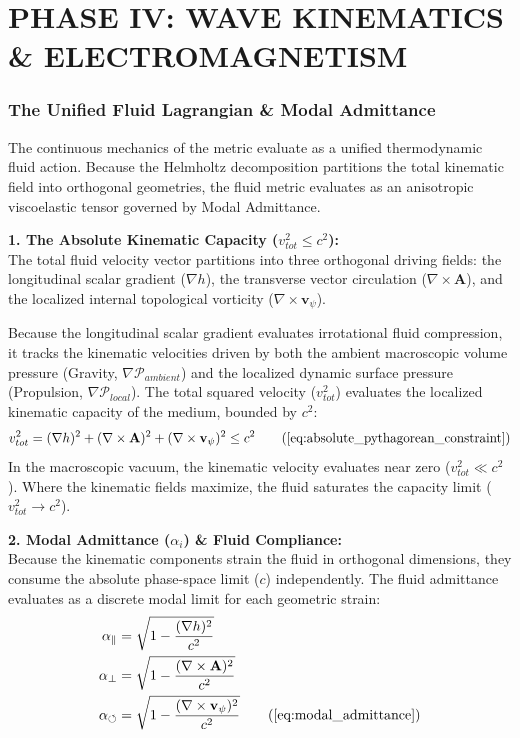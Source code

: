 \documentclass[11pt, a4paper]{article}
\begin{document}
\part*{PHASE IV: WAVE KINEMATICS \& ELECTROMAGNETISM}








\section{The Unified Fluid Lagrangian \& Modal Admittance}
\label{sec:deriv_unified_lagrangian}

The continuous mechanics of the metric evaluate as a unified thermodynamic fluid action. Because the Helmholtz decomposition partitions the total kinematic field into orthogonal geometries, the fluid metric evaluates as an anisotropic viscoelastic tensor governed by Modal Admittance.

\textbf{1. The Absolute Kinematic Capacity ($v_{tot}^2 \le c^2$):} \\
The total fluid velocity vector partitions into three orthogonal driving fields: the longitudinal scalar gradient ($\nabla h$), the transverse vector circulation ($\nabla \times \mathbf{A}$), and the localized internal topological vorticity ($\nabla \times \mathbf{v}_{\psi}$). 

Because the longitudinal scalar gradient evaluates   irrotational fluid compression, it tracks the kinematic velocities driven by both the ambient macroscopic volume pressure (Gravity, $\nabla \mathcal{P}_{ambient}$) and the localized dynamic surface pressure (Propulsion, $\nabla \mathcal{P}_{local}$). The total squared velocity ($v_{tot}^2$) evaluates the localized kinematic capacity of the medium, bounded by $c^2$:
\begin{equation}
    v_{tot}^2 = (\nabla h)^2 + (\nabla \times \mathbf{A})^2 + (\nabla \times \mathbf{v}_{\psi})^2 \le c^2 \tag{\ref{eq:absolute_pythagorean_constraint}}
\end{equation}
In the macroscopic vacuum, the kinematic velocity evaluates near zero ($v_{tot}^2 \ll c^2$). Where the kinematic fields maximize, the fluid saturates the capacity limit ($v_{tot}^2 \to c^2$).

\textbf{2. Modal Admittance ($\alpha_{i}$) \& Fluid Compliance:} \\
Because the kinematic components strain the fluid in orthogonal dimensions, they consume the absolute phase-space limit ($c$) independently. The fluid admittance evaluates as a discrete modal limit for each geometric strain:
\begin{align}
    \alpha_{\parallel} &= \sqrt{1 - \frac{(\nabla h)^2}{c^2}} \nonumber \\
    \alpha_{\perp} &= \sqrt{1 - \frac{(\nabla \times \mathbf{A})^2}{c^2}} \nonumber \\
    \alpha_{\circlearrowleft} &= \sqrt{1 - \frac{(\nabla \times \mathbf{v}_{\psi})^2}{c^2}} \tag{\ref{eq:modal_admittance}}
\end{align}
\end{document}
